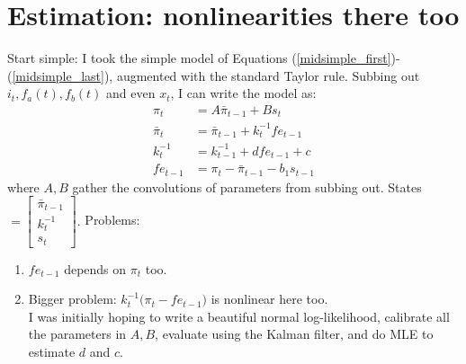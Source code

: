 \documentclass[11pt]{article}
\renewcommand{\[}{\begin{equation}}
\renewcommand{\]}{\end{equation}}
\begin{document}
\section{Estimation: nonlinearities there too}
Start simple: I took the simple model of Equations (\ref{midsimple_first})-(\ref{midsimple_last}), augmented with the standard Taylor rule. Subbing out $i_t, f_a(t), f_{b}(t)$ and even $x_t$,  I can write the model as:
\begin{align}
\pi_t &= A \bar{\pi}_{t-1} + B s_t \\
    \bar{\pi}_{t} & = \bar{\pi}_{t-1} + k_t^{-1} fe_{t-1}   \\
     k_t^{-1} & = k_{t-1}^{-1}  + d fe_{t-1}  + c \\
     fe_{t-1}&  = \pi_t - \bar{\pi}_{t-1}-b_1 s_{t-1}
\end{align}
where $A,B$ gather the convolutions of parameters from subbing out. States $= \begin{bmatrix} \bar{\pi}_{t-1} \\ k_t^{-1} \\ s_t
\end{bmatrix}. $ Problems:
\begin{enumerate}
\item $fe_{t-1}$ depends on $\pi_t$ too.
\item Bigger problem: $ k_t^{-1}\big(\pi_{t} - fe_{t-1} \big)$ is nonlinear here too. \\	
I was initially hoping to write a beautiful normal log-likelihood, calibrate all the parameters in $A, B$, evaluate using the Kalman filter, and do MLE to estimate $d$ and $c$.
\end{enumerate}
\end{document}
